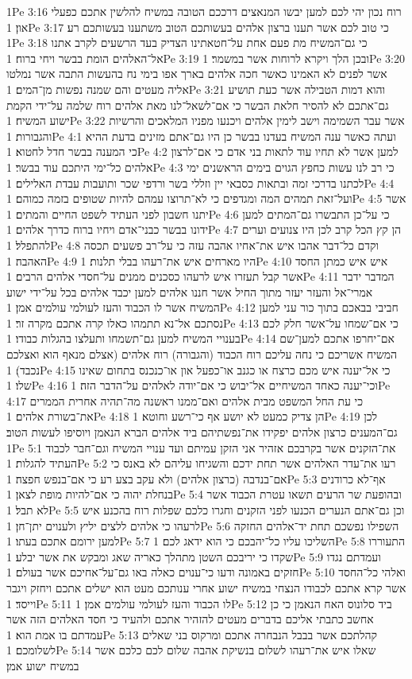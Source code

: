 1Pe 3:16  רוח נכון יהי לכם למען יבשו המנאצים דרככם הטובה במשיח להלשין אתכם כפעלי און׃
1Pe 3:17  כי טוב לכם אשר תענו ברצון אלהים בעשותכם הטוב משתענו בעשותכם רע׃
1Pe 3:18  כי גם־המשיח מת פעם אחת על־חטאתינו הצדיק בעד הרשעים לקרב אתנו אל־האלהים הומת בבשר ויחי ברוח׃
1Pe 3:19  ובכן הלך ויקרא לרוחות אשר במשמר׃
1Pe 3:20  אשר לפנים לא האמינו כאשר חכה אלהים בארך אפו בימי נח בהעשות התבה אשר נמלטו אליה מעטים והם שמנה נפשות מן־המים׃
1Pe 3:21  והוא דמות הטבילה אשר כעת תושיע גם־אתכם לא להסיר חלאת הבשר כי אם־לשאל־לנו מאת אלהים רוח שלמה על־ידי הקמת ישוע המשיח׃
1Pe 3:22  אשר עבר השמימה וישב לימין אלהים ויכנעו מפניו המלאכים והרשיות והגבורות׃
1Pe 4:1  ועתה כאשר ענה המשיח בעדנו בבשר כן היו גם־אתם מזינים בדעת ההיא כי המענה בבשר חדל לחטוא׃
1Pe 4:2  למען אשר לא תחיו עוד לתאות בני אדם כי אם־לרצון אלהים כל־ימי היתכם עוד בבשר׃
1Pe 4:3  כי רב לנו עשות כחפץ הגוים בימים הראשנים ימי לכתנו בדרכי זמה ובתאות כסבאי יין וזללי בשר ורדפי שכר ותועבות עבדת האלילים׃
1Pe 4:4  ועל־זאת תמהים המה ומגדפים כי לא־תרוצו עמהם להיות שטופים בזמה כמוהם׃
1Pe 4:5  אשר יתנו חשבון לפני העתיד לשפט החיים והמתים׃
1Pe 4:6  כי על־כן התבשרו גם־המתים למען ידונו בבשר כבני־אדם ויחיו ברוח כדרך אלהים׃
1Pe 4:7  הן קץ הכל קרב לכן היו צנועים וערים להתפלל׃
1Pe 4:8  וקדם כל־דבר אהבו איש את־אחיו אהבה עזה כי על־רב פשעים תכסה האהבה׃
1Pe 4:9  היו מארחים איש את־רעהו בבלי תלנות׃
1Pe 4:10  איש איש כמתן החסד אשר קבל תעזרו איש לרעהו כסכנים ממנים על־חסדי אלהים הרבים׃
1Pe 4:11  המדבר ידבר אמרי־אל והעזר יעזר מתוך החיל אשר חננו אלהים למען יכבד אלהים בכל על־ידי ישוע המשיח אשר לו הכבוד והעז לעולמי עולמים אמן׃
1Pe 4:12  חביבי בבאכם בתוך כור עני למען נסתכם אל־נא תתמהו כאלו קרה אתכם מקרה זר׃
1Pe 4:13  כי אם־שמחו על־אשר חלק לכם בענויי המשיח למען גם־תשמחו ותעלצו בהגלות כבודו׃
1Pe 4:14  אם־יחרפו אתכם למען־שם המשיח אשריכם כי נחה עליכם רוח הכבוד (והגבורה) רוח אלהים (אצלם מנאף הוא ואצלכם נכבד)׃
1Pe 4:15  כי אל־יענה איש מכם כרצח או כגנב או־כפעל און או־כנכנס בתחום שאינו שלו׃
1Pe 4:16  וכי־יענה כאחד המשיחיים אל־יבוש כי אם־יודה לאלהים על־הדבר הזה׃
1Pe 4:17  כי עת החל המשפט מבית אלהים ואם־ממנו ראשנה מה־תהיה אחרית הממרים את־בשורת אלהים׃
1Pe 4:18  הן צדיק כמעט לא יושע אף כי־רשע וחוטא׃
1Pe 4:19  לכן גם־המענים כרצון אלהים יפקידו את־נפשתיהם ביד אלהים הברא הנאמן ויוסיפו לעשות הטוב׃
1Pe 5:1  את־הזקנים אשר בקרבכם אזהיר אני הזקן עמיתם ועד ענויי המשיח וגם־חבר לכבוד העתיד להגלות׃
1Pe 5:2  רעו את־עדר האלהים אשר תחת ידכם והשגיחו עליהם לא באנס כי אם־בנדבה (כרצון אלהים) ולא עקב בצע רע כי אם־בנפש חפצה׃
1Pe 5:3  אף־לא כרודנים בנחלת יהוה כי אם־להיות מופת לצאן׃
1Pe 5:4  ובהופעת שר הרעים תשאו עטרת הכבוד אשר לא תבל׃
1Pe 5:5  וכן גם־אתם הנערים הכנעו לפני הזקנים וחגרו כלכם שפלות רוח בהכנע איש לרעהו כי אלהים ללצים יליץ ולענוים יתן־חן׃
1Pe 5:6  השפילו נפשכם תחת יד־אלהים החזקה למען ירומם אתכם בעתו׃
1Pe 5:7  השליכו עליו כל־יהבכם כי הוא ידאג לכם׃
1Pe 5:8  התעוררו שקדו כי יריבכם השטן מתהלך כאריה שאג ומבקש את אשר יבלע׃
1Pe 5:9  ועמדתם נגדו חזקים באמונה ודעו כי־ענוים כאלה באו גם־על־אחיכם אשר בעולם׃
1Pe 5:10  ואלהי כל־החסד אשר קרא אתכם לכבודו הנצחי במשיח ישוע אחרי ענותכם מעט הוא ישלים אתכם ויחזק ויגבר וייסד׃
1Pe 5:11  לו הכבוד והעז לעולמי עולמים אמן׃
1Pe 5:12  ביד סלונוס האח הנאמן כי כן אחשב כתבתי אליכם בדברים מעטים להזהיר אתכם ולהעיד כי חסד האלהים הזה אשר עמדתם בו אמת הוא׃
1Pe 5:13  קהלתכם אשר בבבל הנבחרה אתכם ומרקוס בני שאלים לשלומכם׃
1Pe 5:14  שאלו איש את־רעהו לשלום בנשיקת אהבה שלום לכם כלכם אשר במשיח ישוע אמן׃


